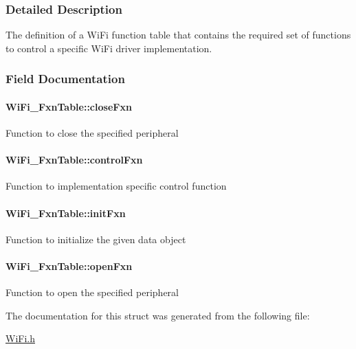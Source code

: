 \subsubsection{Detailed Description}
The definition of a Wi\+Fi function table that contains the required set of functions to control a specific Wi\+Fi driver implementation. 

\subsubsection{Field Documentation}
\paragraph[{close\+Fxn}]{ Wi\+Fi\+\_\+\+Fxn\+Table\+::close\+Fxn}\label{struct_wi_fi___fxn_table_a8ba2076fccbb9723310c51b5b9d3f12c}
Function to close the specified peripheral 
\paragraph[{control\+Fxn}]{ Wi\+Fi\+\_\+\+Fxn\+Table\+::control\+Fxn}\label{struct_wi_fi___fxn_table_a79f8a5ec7b767b5e73bc3f5dc982dbdf}
Function to implementation specific control function 
\paragraph[{init\+Fxn}]{ Wi\+Fi\+\_\+\+Fxn\+Table\+::init\+Fxn}\label{struct_wi_fi___fxn_table_a38d5cdd22d785e50896870c40a0cea52}
Function to initialize the given data object 
\paragraph[{open\+Fxn}]{ Wi\+Fi\+\_\+\+Fxn\+Table\+::open\+Fxn}\label{struct_wi_fi___fxn_table_aa0119e93eb6b25b6323c0756e366c408}
Function to open the specified peripheral 

The documentation for this struct was generated from the following file\+:\begin{DoxyCompactItemize}
\item 
\hyperlink{_wi_fi_8h}{Wi\+Fi.\+h}\end{DoxyCompactItemize}
